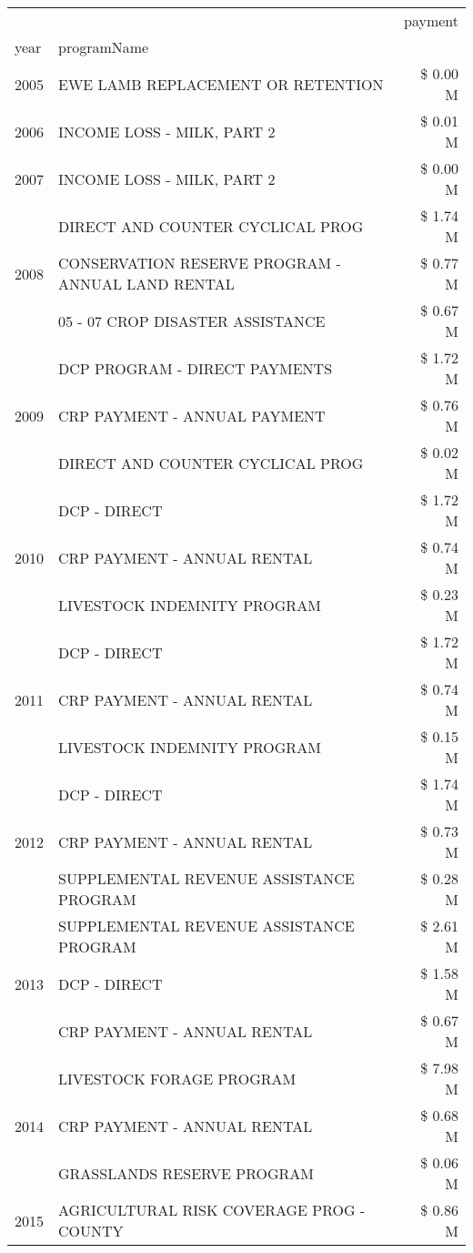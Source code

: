 \begin{tabular}{llr}
\toprule
 &  & payment \\
year & programName &  \\
\midrule
2005 & EWE LAMB REPLACEMENT OR RETENTION & \$ 0.00 M \\
\cline{1-3}
2006 & INCOME LOSS - MILK, PART 2 & \$ 0.01 M \\
\cline{1-3}
2007 & INCOME LOSS - MILK, PART 2 & \$ 0.00 M \\
\cline{1-3}
\multirow[t]{3}{*}{2008} & DIRECT AND COUNTER CYCLICAL PROG & \$ 1.74 M \\
 & CONSERVATION RESERVE PROGRAM - ANNUAL LAND RENTAL & \$ 0.77 M \\
 & 05 - 07 CROP DISASTER ASSISTANCE & \$ 0.67 M \\
\cline{1-3}
\multirow[t]{3}{*}{2009} & DCP PROGRAM - DIRECT PAYMENTS & \$ 1.72 M \\
 & CRP PAYMENT - ANNUAL PAYMENT & \$ 0.76 M \\
 & DIRECT AND COUNTER CYCLICAL PROG & \$ 0.02 M \\
\cline{1-3}
\multirow[t]{3}{*}{2010} & DCP - DIRECT & \$ 1.72 M \\
 & CRP PAYMENT - ANNUAL RENTAL & \$ 0.74 M \\
 & LIVESTOCK INDEMNITY PROGRAM & \$ 0.23 M \\
\cline{1-3}
\multirow[t]{3}{*}{2011} & DCP - DIRECT & \$ 1.72 M \\
 & CRP PAYMENT - ANNUAL RENTAL & \$ 0.74 M \\
 & LIVESTOCK INDEMNITY PROGRAM & \$ 0.15 M \\
\cline{1-3}
\multirow[t]{3}{*}{2012} & DCP - DIRECT & \$ 1.74 M \\
 & CRP PAYMENT - ANNUAL RENTAL & \$ 0.73 M \\
 & SUPPLEMENTAL REVENUE ASSISTANCE PROGRAM & \$ 0.28 M \\
\cline{1-3}
\multirow[t]{3}{*}{2013} & SUPPLEMENTAL REVENUE ASSISTANCE PROGRAM & \$ 2.61 M \\
 & DCP - DIRECT & \$ 1.58 M \\
 & CRP PAYMENT - ANNUAL RENTAL & \$ 0.67 M \\
\cline{1-3}
\multirow[t]{3}{*}{2014} & LIVESTOCK FORAGE PROGRAM & \$ 7.98 M \\
 & CRP PAYMENT - ANNUAL RENTAL & \$ 0.68 M \\
 & GRASSLANDS RESERVE PROGRAM & \$ 0.06 M \\
\cline{1-3}
\multirow[t]{3}{*}{2015} & AGRICULTURAL RISK COVERAGE PROG - COUNTY & \$ 0.86 M \\

\end{tabular}
